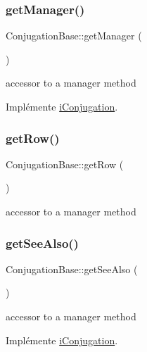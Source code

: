 \subsubsection{\texorpdfstring{get\+Manager()}{getManager()}}
{\footnotesize\ttfamily Conjugation\+Base\+::get\+Manager (\begin{DoxyParamCaption}{ }\end{DoxyParamCaption})}

accessor to a manager method 

Implémente \hyperlink{interfaceiConjugation_a448829b47813a79d1f8ec65de91e8696}{i\+Conjugation}.

\hypertarget{classConjugationBase_a0a30ad37c192a95d0986b77999a2ce5d}{}\label{classConjugationBase_a0a30ad37c192a95d0986b77999a2ce5d} 
\subsubsection{\texorpdfstring{get\+Row()}{getRow()}}
{\footnotesize\ttfamily Conjugation\+Base\+::get\+Row (\begin{DoxyParamCaption}{ }\end{DoxyParamCaption})}

accessor to a manager method \hypertarget{classConjugationBase_a76d7179c150a4e32fb410d5af9bc388c}{}\label{classConjugationBase_a76d7179c150a4e32fb410d5af9bc388c} 
\subsubsection{\texorpdfstring{get\+See\+Also()}{getSeeAlso()}}
{\footnotesize\ttfamily Conjugation\+Base\+::get\+See\+Also (\begin{DoxyParamCaption}{ }\end{DoxyParamCaption})}

accessor to a manager method 

Implémente \hyperlink{interfaceiConjugation_a58e61c703ad1f0d76db1535235e530a0}{i\+Conjugation}.

\hypertarget{classConjugationBase_a97684bf47a4b158a2d4f5716f9187730}{}\label{classConjugationBase_a97684bf47a4b158a2d4f5716f9187730} 
